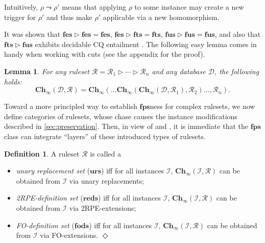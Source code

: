 \documentclass[10pt,a4paper]{amsart}
\theoremstyle{definition}
\numberwithin{equation}{section}
\providecommand{\sa}{\mathbf{Ch}_{\infty}}
\theoremstyle{plain}
\newtheorem{lemma}[lemma]{Lemma}
\theoremstyle{definition}
\newtheorem{definition}[definition]{Definition}
\theoremstyle{myexample}
\theoremstyle{plain}
\theoremstyle{definition}
\newcommand{\instance}{\mathcal{I}}
\newcommand{\inst}{\instance}
\newcommand{\database}{\mathcal{D}}
\newcommand{\db}{\database}
\newcommand{\hypercliquewidth}{\partitionwidth}
\newcommand{\partitionwidth}{par\-ti\-tion\-width}
\newcommand{\triggers}[2]{#1 \leadsto #2}
\newcommand{\cut}{\triangleright}
\newcommand{\ruleset}{\calr}
\newcommand{\bts}{\mathbf{fts}}
\newcommand{\fes}{\mathbf{fes}}
\newcommand{\fus}{\mathbf{fus}}
\newcommand{\fps}{\mathbf{fps}} %
\newcommand{\hcs}{\fps}
\newcommand{\fhcs}{\hcs}
\newcommand{\urs}{\mathbf{urs}}
\newcommand{\reds}{\mathbf{reds}}
\newcommand{\fods}{\mathbf{fods}}
\renewcommand{\sa}{\mathbf{Ch}_{\infty}}
\newcommand{\calr}{\mathcal{R}}
\newcommand{\app}{Appx.} %
\newcommand{\defend}{\hfill\ensuremath{\Diamond}}
\begin{document}
Intuitively, $\triggers{\rho}{\rho'}$ means that applying $\rho$ to some instance may create a new trigger for $\rho'$ and thus make $\rho'$ applicable via a new homomorphism.

%
It was shown that \mbox{$\fes \cut \fes = \fes$}, \mbox{$\fes \cut \bts = \bts$}, \mbox{$\fus \cut \fus = \fus$}, and also that $\bts \cut \fus$ exhibits decidable CQ entailment \cite{BagLecMugSal11}. %
%
The following easy lemma comes in handy when working with cuts (see the appendix for the proof). %

\begin{lemma}\label{lem:n-cut-layered-chase}
For any ruleset $\ruleset = \ruleset_{1} \cut \cdots \cut \ruleset_{n}$ and any database $\db$, the following holds:
$$
\sa(\db,\ruleset) = \sa(\ldots\sa(\sa(\db,\ruleset_{1}),\ruleset_{2}) \ldots, \ruleset_{n}).
$$
\end{lemma}




Toward a more principled way to establish $\fhcs$ness for complex rulesets, we now define categories of rulesets, whose chase causes the instance modifications described in  \cref{sec:preservation}. 
Then, in view of  and , it is immediate that the $\fhcs$ class can integrate ``layers'' of these introduced types of rulesets.  

\begin{definition}
A ruleset $\ruleset$ is called a
\begin{itemize}
\item 
\emph{unary replacement set} ($\urs$) iff  for all instances $\inst$, $\sa(\instance,\ruleset)$ can be obtained from $\instance$ via unary replacements; 
\item 
\emph{2RPE-definition set} ($\reds$) iff  for all instances $\inst$, $\sa(\instance,\ruleset)$ can be obtained from $\instance$ via 2RPE-extensions;
\item 
\emph{FO-definition set} ($\fods$) iff  for all instances $\inst$, $\sa(\instance,\ruleset)$ can be obtained from $\instance$ via FO-extensions. 
\defend
\end{itemize}
\end{definition}
\end{document}
